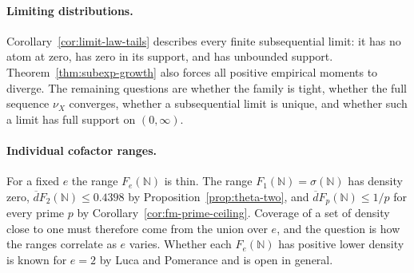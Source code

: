 \documentclass[11pt]{article}
\theoremstyle{remark}
\newcommand{\N}{\mathbb N}
\newcommand{\1}{\mathbf 1}
\newcommand{\upperdens}{\overline d}
\begin{document}
\paragraph{Limiting distributions.}
Corollary~\ref{cor:limit-law-tails} describes every finite subsequential limit:
it has no atom at zero, has zero in its support, and has unbounded support.
Theorem~\ref{thm:subexp-growth} also forces all positive empirical moments to
diverge.  The remaining questions are whether the family is tight, whether
the full sequence $\nu_X$ converges, whether a subsequential limit is unique,
and whether such a limit has full support on $(0,\infty)$.

\paragraph{Individual cofactor ranges.}
For a fixed $e$ the range $F_e(\N)$ is thin.  The range $F_1(\N)=\sigma(\N)$
has density zero, $\upperdens F_2(\N)\leq0.4398$ by
Proposition~\ref{prop:theta-two}, and $\upperdens F_p(\N)\leq1/p$ for every
prime $p$ by Corollary~\ref{cor:fm-prime-ceiling}.  Coverage of a set of
density close to one must therefore come from the union over $e$, and the
question is how the ranges correlate as $e$ varies.  Whether each
$F_e(\N)$ has positive lower density is known for $e=2$ by Luca and
Pomerance \cite{LucaPomerance} and is open in general.
\end{document}
